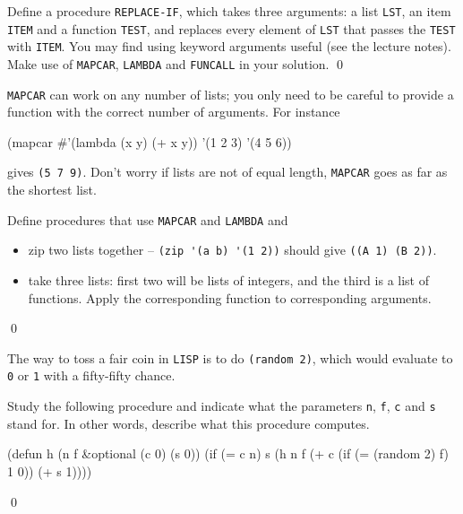 \documentclass[a4paper,11pt]{article}
\begin{document}
\begin{uexercise}

Define a procedure \Verb+REPLACE-IF+, which takes three arguments: a list \Verb+LST+, an item \Verb+ITEM+ and a function \Verb+TEST+, and replaces every element of \Verb+LST+ that passes the \Verb+TEST+ with \Verb+ITEM+. You may find using keyword arguments useful (see the lecture notes). Make use of \Verb+MAPCAR+, \Verb+LAMBDA+ and \Verb+FUNCALL+ in your solution.   
\qed
\end{uexercise}

\begin{uexercise}
\label{multi-mapcar}

\Verb+MAPCAR+ can work on any number of lists; you only need to be careful to provide a function with the correct number of arguments. For instance

\begin{lispcode}
(mapcar #'(lambda (x y) (+ x y)) '(1 2 3) '(4 5 6))
\end{lispcode}
gives \Verb+(5 7 9)+. Don't worry if lists are not of equal length, \Verb+MAPCAR+ goes as far as the shortest list.

Define procedures that use \Verb+MAPCAR+ and \Verb+LAMBDA+ and

\begin{itemize}
\item zip two lists together -- \Verb+(zip '(a b) '(1 2))+ should give \Verb+((A 1) (B 2))+. 
\item take three lists: first two will be lists of integers, and the third is a list of functions. Apply the corresponding function to corresponding arguments.
\end{itemize}

\qed
\end{uexercise}

\begin{uexercise}
The way to toss a fair coin in \Verb+LISP+ is to do \Verb+(random 2)+, which would evaluate to \Verb+0+ or \Verb+1+ with a fifty-fifty chance.

Study the following procedure and indicate what the parameters \Verb+n+, \Verb+f+, \Verb+c+ and \Verb+s+ stand for. In other words, describe what this procedure computes.

\begin{lispcode}
(defun h (n f &optional (c 0) (s 0))
  (if (= c n)
    s
    (h n f (+ c (if (= (random 2) f) 1 0)) (+ s 1))))
\end{lispcode}

\qed
\end{uexercise}
\end{document}
